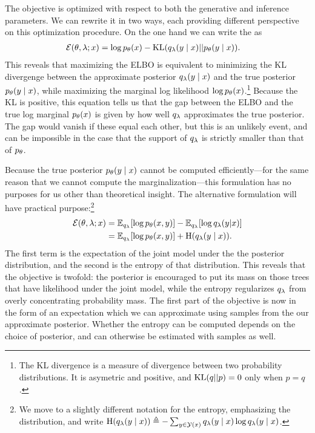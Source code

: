     The objective is optimized with respect to both the generative and inference parameters. We can rewrite it in two ways, each providing different perspective on this optimization procedure. On the one hand we can write the as \citep{blei2016vi}
    \begin{align*}
      \operatorname{\mathcal{E}}(\theta, \lambda; x) &= \log p_{\theta}(x) - \operatorname{KL}(q_{\lambda}(y \mid x) \rvert\lvert p_{\theta}(y \mid x)).
    \end{align*}
    This reveals that maximizing the ELBO is equivalent to minimizing the KL divergenge between the approximate posterior $q_{\lambda}(y \mid x)$ and the true posterior $p_{\theta}(y \mid x)$, while maximizing the marginal log likelihood $\log p_{\theta}(x)$.\footnote{The KL divergence is a measure of divergence between two probability distributions. It is asymetric and positive, and $\operatorname{KL}(q \rvert\lvert p) = 0$ only when $p = q$.} Because the KL is positive, this equation tells us that the gap between the ELBO and the true log marginal $p_{\theta}(x)$ is given by how well $q_{\lambda}$ approximates the true posterior. The gap would vanish if these equal each other, but this is an unlikely event, and can be impossible in the case that the support of $q_{\lambda}$ is strictly smaller than that of $p_{\theta}$.

    Because the true posterior $p_{\theta}(y \mid x)$ cannot be computed efficiently---for the same reason that we cannot compute the marginalization---this formulation has no purposes for us other than theoretical insight. The alternative formulation will have practical purpose:\footnote{We move to a slightly different notation for the entropy, emphasizing the distribution, and write $\operatorname{H}(q_{\lambda}(y \mid x)) \triangleq - \sum_{y \in \mathcal{Y}(x)} q_{\lambda}(y \mid x) \log q_{\lambda}(y \mid x)$.}
    \begin{align}
      \operatorname{\mathcal{E}}(\theta, \lambda; x)
        &= \operatorname{\mathbb{E}}_{q_{\lambda}} [ \log p_{\theta}( x, y ) ] - \operatorname{\mathbb{E}}_{q_{\lambda}} [ \log q_{\lambda}(y | x) ]  \nonumber \\
        &= \operatorname{\mathbb{E}}_{q_{\lambda}} [ \log p_{\theta}( x, y ) ] + \operatorname{H}(q_{\lambda}(y \mid x)).
    \end{align}
    The first term is the expectation of the joint model under the the posterior distribution, and the second is the entropy of that distribution. This reveals that the objective is twofold: the posterior is encouraged to put its mass on those trees that have likelihood under the joint model, while the entropy regularizes $q_{\lambda}$ from overly concentrating probability mass. The first part of the objective is now in the form of an expectation which we can approximate using samples from the our approximate posterior. Whether the entropy can be computed depends on the choice of posterior, and can otherwise be estimated with samples as well.


